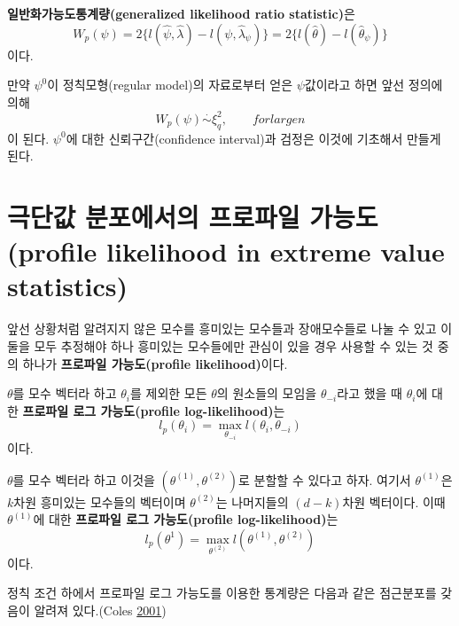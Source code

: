 \documentclass[b5paper,]{book}
\theoremstyle{definition}
\theoremstyle{definition}
\theoremstyle{definition}
\theoremstyle{remark}
\let\BeginKnitrBlock\begin \let\EndKnitrBlock\end
\begin{document}
\BeginKnitrBlock{definition}[일반화가능도통계량]
\protect\hypertarget{def:unnamed-chunk-240}{}{\label{def:unnamed-chunk-240}
{}
}\textbf{일반화가능도통계량(generalized likelihood ratio statistic)}은
\[W_{p}(\psi)=2\{l(\hat{\psi},\hat{\lambda})-l(\psi,\hat{\lambda}_{\psi})\}=2\{l(\hat{\theta})-l(\hat{\theta}_{\psi})\}\]
이다.
\EndKnitrBlock{definition}

만약 \(\psi^{0}\)이 정칙모형(regular model)의 자료로부터 얻은
\(\psi\)값이라고 하면 앞선 정의에 의해
\[W_{p}(\psi) \stackrel{\cdot}{\sim} \xi_{q}^{2}, \qquad{for large n}\]
이 된다. \(\psi^{0}\)에 대한 신뢰구간(confidence interval)과 검정은
이것에 기초해서 만들게 된다.

\section{극단값 분포에서의 프로파일 가능도(profile likelihood in extreme
value
statistics)}\label{---profile-likelihood-in-extreme-value-statistics}

앞선 상황처럼 알려지지 않은 모수를 흥미있는 모수들과 장애모수들로 나눌
수 있고 이 둘을 모두 추정해야 하나 흥미있는 모수들에만 관심이 있을 경우
사용할 수 있는 것 중의 하나가 \textbf{프로파일 가능도(profile
likelihood)}이다.

\BeginKnitrBlock{definition}[프로파일 가능도]
\protect\hypertarget{def:unnamed-chunk-241}{}{\label{def:unnamed-chunk-241}
{} }\(\theta\)를 모수 벡터라 하고
\(\theta_{i}\)를 제외한 모든 \(\theta\)의 원소들의 모임을
\(\theta_{-i}\)라고 했을 때 \(\theta_{i}\)에 대한 \textbf{프로파일 로그
가능도(profile log-likelihood)}는
\[l_{p}(\theta_{i})=\max_{\theta_{-i}}l(\theta_{i},\theta_{-i})\] 이다.
\EndKnitrBlock{definition}

\BeginKnitrBlock{definition}[프로파일 로그 가능도]
\protect\hypertarget{def:unnamed-chunk-242}{}{\label{def:unnamed-chunk-242}
{} }\(\theta\)를 모수 벡터라 하고
이것을 \((\theta^{(1)}, \theta^{(2)})\)로 분할할 수 있다고 하자. 여기서
\(\theta^{(1)}\)은 \(k\)차원 흥미있는 모수들의 벡터이며
\(\theta^{(2)}\)는 나머지들의 \((d-k)\)차원 벡터이다. 이때
\(\theta^{(1)}\)에 대한 \textbf{프로파일 로그 가능도(profile
log-likelihood)}는
\[l_{p}(\theta^{1})=\max_{\theta^{(2)}}l(\theta^{(1)},\theta^{(2)})\]
이다.
\EndKnitrBlock{definition}

정칙 조건 하에서 프로파일 로그 가능도를 이용한 통계량은 다음과 같은
점근분포를 갖음이 알려져 있다.(Coles
\protect\hyperlink{ref-Coles2001}{2001})
\end{document}
